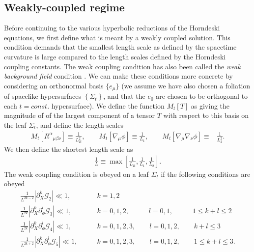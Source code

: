 \documentclass{ws-ijmpd}
\begin{document}
\subsection{Weakly-coupled regime
\label{sec:weak_coupling}
}
Before continuing to the various hyperbolic reductions of the
Horndeski equations, we first define what is meant
by a weakly coupled solution.
This condition demands that the smallest length scale as defined
by the spacetime curvature is large compared to the length scales defined
by the Horndeski coupling constants.
The weak coupling condition
has also been called the \emph{weak background field} condition
\cite{Papallo:2017qvl}.  
We can make these conditions more concrete by considering
an orthonormal basis $\{e_{\mu}\}$ (we assume we have also chosen a
foliation of spacelike hypersurfaces $\left\{\Sigma_t\right\}$, 
and that the $e_0$ are chosen to be orthogonal to 
each $t=const.$ hypersurface).
We define the function
$M_t\left[T\right]$ as giving the magnitude of of the largest
component of a tensor $T$ with respect to this basis on the
leaf $\Sigma_t$, and define the length scales
\begin{align}
   M_t\left[R^{\alpha}{}_{\mu\beta\nu}\right]
   \equiv
   \frac{1}{L_R^2}
   ,\qquad
   M_t\left[\nabla_{\mu}\phi\right]
   \equiv
   \frac{1}{L_1}
   ,\qquad
   M_t\left[\nabla_{\mu}\nabla_{\nu}\phi\right]
   \equiv&
   \frac{1}{L_2^2}
   .
\end{align}
We then define the shortest length scale as
\begin{align}
   \frac{1}{L}
   \equiv
   \max\left[\frac{1}{L_R},\frac{1}{L_1},\frac{1}{L_2}\right]
   .
\end{align}
The weak coupling condition is obeyed on a leaf $\Sigma_t$ if the following
conditions are obeyed
\begin{subequations}
\label{eq:weak_coupling_conditions}
\begin{align}
   \frac{1}{L^{2k-2}}
   \left|\partial_X^k\mathcal{G}_2\right|
   \ll
   1
   ,&\qquad
   k=1,2
   \\
   \frac{1}{L^{2k}}
   \left|\partial_X^k\partial_{\phi}^l\mathcal{G}_3\right|
   \ll
   1
   ,&\qquad
   k=0,1,2,\;\;\;\qquad l=0,1,\;\;\; \qquad 1\leq k+l\leq 2
   \\
   \frac{1}{L^{2k}}
   \left|\partial_X^k\partial_{\phi}^l\mathcal{G}_4\right|
   \ll
   1
   ,&\qquad
   k=0,1,2,3,\qquad l=0,1,2,\qquad k+l \leq 3
   \\
   \frac{1}{L^{2k+2}}
   \left|\partial_X^k\partial_{\phi}^l\mathcal{G}_5\right|
   \ll
   1
   ,&\qquad
   k=0,1,2,3,\qquad l=0,1,2,\qquad 1\leq k+l \leq 3
   .
\end{align}
\end{subequations}
\end{document}
